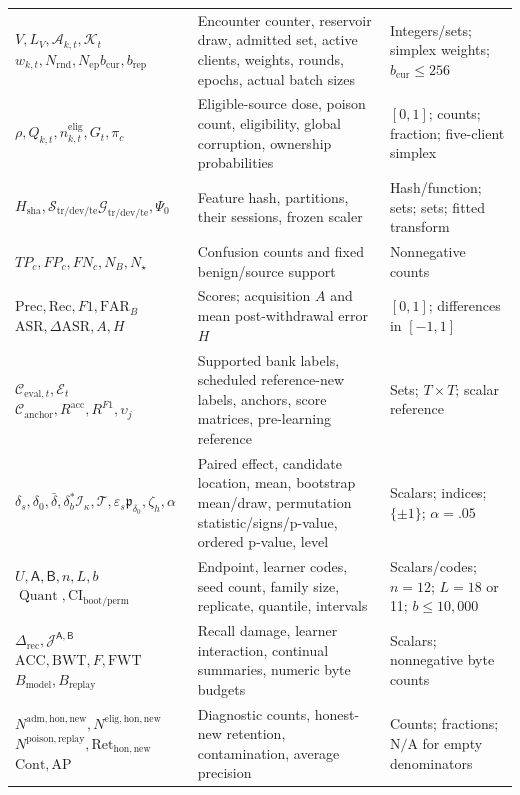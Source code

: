 \documentclass[10pt,a4paper]{article}
\newcommand{\NA}{\mathrm{N/A}}
\begin{document}
\begin{longtable}{p{3.3cm}l p{4.4cm}}
$V,L_V,\mathcal A_{k,t},\mathcal K_t$\newline $w_{k,t},N_{\mathrm{rnd}},N_{\mathrm{ep}}$\newline $b_{\mathrm{cur}},b_{\mathrm{rep}}$ & Encounter counter, reservoir draw, admitted set, active clients, weights, rounds, epochs, actual batch sizes & Integers/sets; simplex weights; $b_{\mathrm{cur}}\le256$\\
$\rho,Q_{k,t},n^{\mathrm{elig}}_{k,t},G_t,\pi_c$ & Eligible-source dose, poison count, eligibility, global corruption, ownership probabilities & $[0,1]$; counts; fraction; five-client simplex\\
$H_{\mathrm{sha}},\mathcal S_{\mathrm{tr/dev/te}}$\newline $\mathcal G_{\mathrm{tr/dev/te}},\Psi_0$ & Feature hash, partitions, their sessions, frozen scaler & Hash/function; sets; sets; fitted transform\\
$TP_c,FP_c,FN_c,N_B,N_\star$ & Confusion counts and fixed benign/source support & Nonnegative counts\\
$\mathrm{Prec},\mathrm{Rec},F1,\mathrm{FAR}_B$\newline $\mathrm{ASR},\Delta\mathrm{ASR},A,H$ & Scores; acquisition $A$ and mean post-withdrawal error $H$ & $[0,1]$; differences in $[-1,1]$\\
$\mathcal C_{{\mathrm{eval}},t},\mathcal E_t$\newline $\mathcal C_{\mathrm{anchor}},R^{\mathrm{acc}},R^{F1},\upsilon_j$ & Supported bank labels, scheduled reference-new labels, anchors, score matrices, pre-learning reference & Sets; $T\!\times\!T$; scalar reference\\
$\delta_s,\delta_0,\bar\delta,\delta^*_b$\newline $\mathcal I_\kappa,\mathcal T,\varepsilon_s$\newline $\mathfrak p_{\delta_0},\zeta_h,\alpha$ & Paired effect, candidate location, mean, bootstrap mean/draw, permutation statistic/signs/p-value, ordered p-value, level & Scalars; indices; $\{\pm1\}$; $\alpha=.05$\\
$U,\mathsf A,\mathsf B,n,L,b$\newline $\operatorname{Quant},\mathrm{CI}_{\mathrm{boot/perm}}$ & Endpoint, learner codes, seed count, family size, replicate, quantile, intervals & Scalars/codes; $n=12$; $L=18$ or 11; $b\le10{,}000$\\
$\Delta_{\mathrm{rec}},\mathcal J^{\mathsf A,\mathsf B}$\newline $\mathrm{ACC},\mathrm{BWT},F,\mathrm{FWT}$\newline $B_{\mathrm{model}},B_{\mathrm{replay}}$ & Recall damage, learner interaction, continual summaries, numeric byte budgets & Scalars; nonnegative byte counts\\
$N^{\mathrm{adm,hon,new}},N^{\mathrm{elig,hon,new}}$\newline $N^{\mathrm{poison,replay}},\mathrm{Ret}_{\mathrm{hon,new}}$\newline $\mathrm{Cont},\mathrm{AP}$ & Diagnostic counts, honest-new retention, contamination, average precision & Counts; fractions; $\NA$ for empty denominators\\
\bottomrule
\end{longtable}
\end{document}
